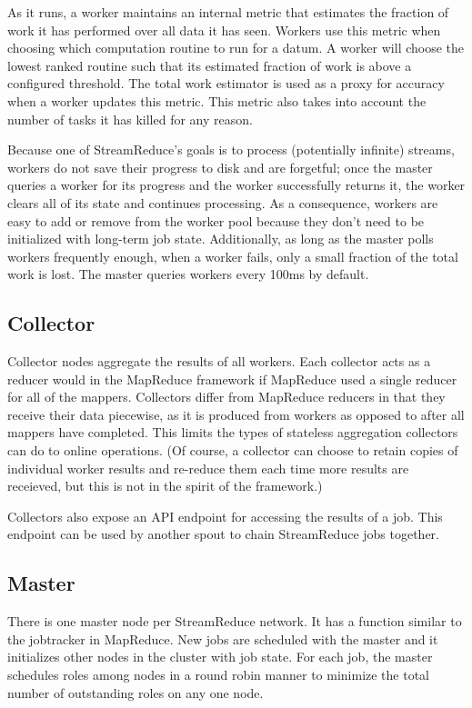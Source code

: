\documentclass[12pt,twocolumn]{article}
\begin{document}
As it runs, a worker maintains an internal metric that estimates the fraction of work
it has performed over all data it has seen. Workers use this metric when choosing which
computation routine to run for a datum. A worker will choose the lowest ranked routine
such that its estimated fraction of work is above a configured threshold.
The total work estimator is used as a proxy for accuracy when a worker updates
this metric. This metric also takes into account the number of tasks it has killed
for any reason.

Because one of StreamReduce's goals is to process (potentially infinite) streams, workers do not
save their progress to disk and are forgetful; once the master queries a worker for its
progress and the worker successfully returns it, the worker clears all of its state and
continues processing. As a consequence, workers are easy to add or remove from the worker
pool because they don't need to be initialized with long-term job state. Additionally, as
long as the master polls workers frequently enough, when a worker fails, only a small
fraction of the total work is lost. The master queries workers every 100ms by default.
\subsection{Collector}
Collector nodes aggregate the results of all workers. Each collector acts as a reducer would
in the MapReduce framework if MapReduce used a single reducer for all of the mappers.
Collectors differ from MapReduce reducers in that they receive their data piecewise, as it
is produced from workers as opposed to after all mappers have completed. This limits the
types of stateless aggregation collectors can do to online operations. (Of course, a collector
can choose to retain copies of individual worker results and re-reduce them each time more
results are receieved, but this is not in the spirit of the framework.)

Collectors also expose an API endpoint for accessing the results of a job. This endpoint
can be used by another spout to chain StreamReduce jobs together.
\subsection{Master}
\label{sec:master}
There is one master node per StreamReduce network. It has a function similar to the jobtracker in
MapReduce. New jobs are scheduled with the master and it initializes other nodes in the
cluster with job state. For each job, the master schedules roles among nodes in a round robin
manner to minimize the total number of outstanding roles on any one node.
\end{document}
